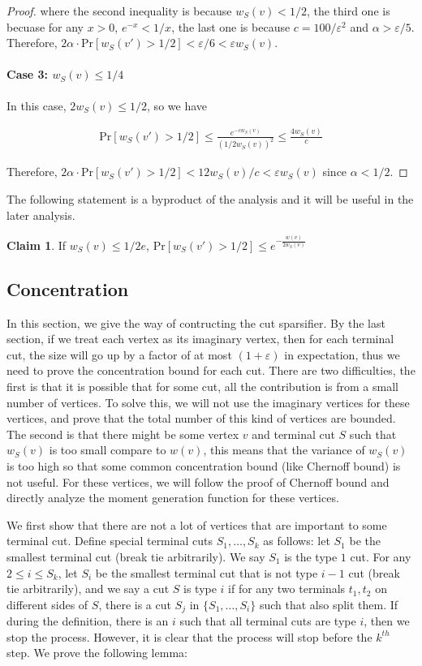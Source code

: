 \documentclass[11pt]{article}
\theoremstyle{definition}
\newtheorem{claim}[theorem]{Claim}
\newcommand{\eps}{{\varepsilon}}
\def\pr#1{\mathrm{Pr}\left[ #1 \right]}
\begin{document}
\begin{proof}
where the second inequality is because $w_S(v) < 1/2$, the third one is becuase for any $x>0$, $e^{-x}<1/x$, the last one is because $c=100/\eps^2$ and $\alpha>\eps/5$. Therefore, $2\alpha \cdot \pr{w_S(v') > 1/2} < \eps/6 < \eps w_S(v)$. 

\paragraph{Case 3: $w_S(v) \le 1/4$} In this case, $2w_S(v) \le 1/2$, so we have

\begin{align*}
    \pr{w_S(v') > 1/2} \le \frac{e^{-c w_S(v)}}{(1/2w_S(v))^2} \le \frac{4w_S(v)}{c}
\end{align*}

Therefore, $2\alpha \cdot \pr{w_S(v') > 1/2} < 12 w_S(v)/c < \eps w_S(v)$ since $\alpha < 1/2$.
\end{proof}

The following statement is a byproduct of the analysis and it will be useful in the later analysis.

\begin{claim} \label{prop:v2}
    If $w_S(v) \le 1/2e$, $\pr{w_S(v') > 1/2} \le e^{-\frac{w(v)}{2w_S(v)}}$
\end{claim}

\subsection{Concentration}
In this section, we give the way of contructing the cut sparsifier. By the last section, if we treat each vertex as its imaginary vertex, then for each terminal cut, the size will go up by a factor of at most $(1+\eps)$ in expectation, thus we need to prove the concentration bound for each cut. There are two difficulties, the first is that it is possible that for some cut, all the contribution is from a small number of vertices. To solve this, we will not use the imaginary vertices for these vertices, and prove that the total number of this kind of vertices are bounded. The second is that there might be some vertex $v$ and terminal cut $S$ such that $w_S(v)$ is too small compare to $w(v)$, this means that the variance of $w_S(v)$ is too high so that some common concentration bound (like Chernoff bound) is not useful. For these vertices, we will follow the proof of Chernoff bound and directly analyze the moment generation function for these vertices. 

We first show that there are not a lot of vertices that are important to some terminal cut. Define special terminal cuts $S_1,\dots, S_k$ as follows: let $S_1$ be the smallest terminal cut (break tie arbitrarily). We say $S_1$ is the type $1$ cut. For any $2 \le i \le S_k$, let $S_i$ be the smallest terminal cut that is not type $i-1$ cut (break tie arbitrarily), and we say a cut $S$ is type $i$ if for any two terminals $t_1, t_2$ on different sides of $S$, there is a cut $S_j$ in $\{S_1,\dots, S_i\}$ such that also split them. If during the definition, there is an $i$ such that all terminal cuts are type $i$, then we stop the process. However, it is clear that the process will stop before the $k^{th}$ step. We prove the following lemma:
\end{document}
